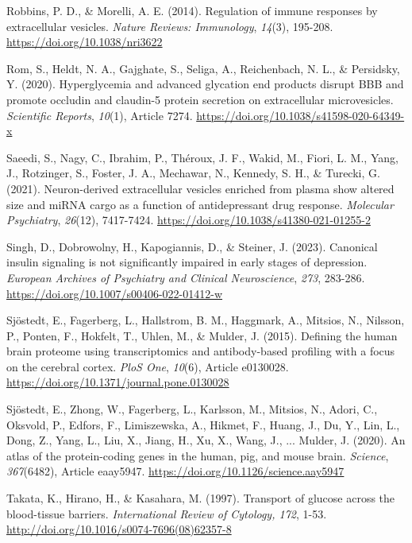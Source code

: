 \documentclass[authordate, empirical]{jote-new-article}
\begin{document}
	Robbins, P. D., \& Morelli, A. E. (2014). Regulation of immune responses by extracellular vesicles. \emph{Nature Reviews: Immunology},\emph{ 14}(3), 195-208. \url{https://doi.org/10.1038/nri3622}



	Rom, S., Heldt, N. A., Gajghate, S., Seliga, A., Reichenbach, N. L., \& Persidsky, Y. (2020). Hyperglycemia and advanced glycation end products disrupt BBB and promote occludin and claudin-5 protein secretion on extracellular microvesicles. \emph{Scientific Reports},\emph{ 10}(1), Article 7274. \url{https://doi.org/10.1038/s41598-020-64349-x}



	Saeedi, S., Nagy, C., Ibrahim, P., Théroux, J. F., Wakid, M., Fiori, L. M., Yang, J., Rotzinger, S., Foster, J. A., Mechawar, N., Kennedy, S. H., \& Turecki, G. (2021). Neuron-derived extracellular vesicles enriched from plasma show altered size and miRNA cargo as a function of antidepressant drug response. \emph{Molecular Psychiatry},\emph{ 26}(12), 7417-7424. \url{https://doi.org/10.1038/s41380-021-01255-2}



	Singh, D., Dobrowolny, H., Kapogiannis, D., \& Steiner, J. (2023). Canonical insulin signaling is not significantly impaired in early stages of depression. \emph{European Archives of Psychiatry and Clinical Neuroscience},\emph{ 273}, 283-286. \url{https://doi.org/10.1007/s00406-022-01412-w}



	Sjöstedt, E., Fagerberg, L., Hallstrom, B. M., Haggmark, A., Mitsios, N., Nilsson, P., Ponten, F., Hokfelt, T., Uhlen, M., \& Mulder, J. (2015). Defining the human brain proteome using transcriptomics and antibody-based profiling with a focus on the cerebral cortex. \emph{PloS One},\emph{ 10}(6), Article e0130028. \url{https://doi.org/10.1371/journal.pone.0130028}



	Sjöstedt, E., Zhong, W., Fagerberg, L., Karlsson, M., Mitsios, N., Adori, C., Oksvold, P., Edfors, F., Limiszewska, A., Hikmet, F., Huang, J., Du, Y., Lin, L., Dong, Z., Yang, L., Liu, X., Jiang, H., Xu, X., Wang, J., ... Mulder, J. (2020). An atlas of the protein-coding genes in the human, pig, and mouse brain. \emph{Science},\emph{ 367}(6482), Article eaay5947. \url{https://doi.org/10.1126/science.aay5947}



	Takata, K., Hirano, H., \& Kasahara, M. (1997). Transport of glucose across the blood-tissue barriers. \emph{International Review of Cytology, 172}, 1-53. \url{http://doi.org/10.1016/s0074-7696(08)62357-8}
\end{document}
